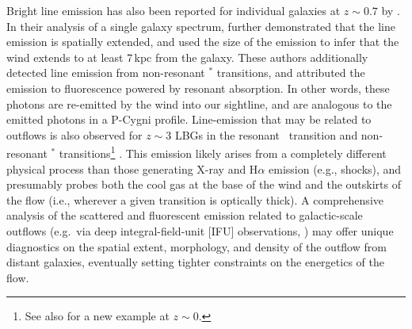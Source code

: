 \documentclass[]{emulateapj}
\begin{document}
Bright  line emission has also been
reported for individual galaxies at $z \sim 0.7$ by \cite[][see also
Rubin et al\ 2011, in prep.]{rubin+10c}.
In their analysis of a single galaxy spectrum, \cite{rubin+10c}
further demonstrated that the  line emission is spatially
extended, and used the size of the emission to infer that the wind 
extends to at least 7\,kpc from the galaxy.
These authors additionally detected line
emission from non-resonant $^*$ transitions, and attributed
the emission to fluorescence powered by  resonant
absorption.  In other words, these photons are re-emitted by the wind
into our sightline, and are analogous to the emitted photons in a P-Cygni profile.
Line-emission that may be related to outflows is
also observed for $z \sim 3$ LBGs in the resonant \lya\ transition
and non-resonant $^*$ transitions\footnote{See also
  \cite{france10} for a new example at $z \sim 0$.} \citep{prs+02,shapley03}.
This emission likely arises from a completely different
physical process than those generating X-ray and H$\alpha$ emission
(e.g., shocks), and presumably probes both the cool gas at the base of
the wind and the outskirts of the flow (i.e., wherever a given
transition is optically thick).
A comprehensive analysis of the %
scattered and fluorescent emission
related to galactic-scale outflows
(e.g.\ via deep integral-field-unit [IFU] observations,
\citealt{ssb+05,wsg08}) 
may offer unique
diagnostics on the spatial extent, morphology, and density of the outflow 
from distant galaxies,
eventually
setting tighter constraints on the energetics of the flow.   

\end{document}
